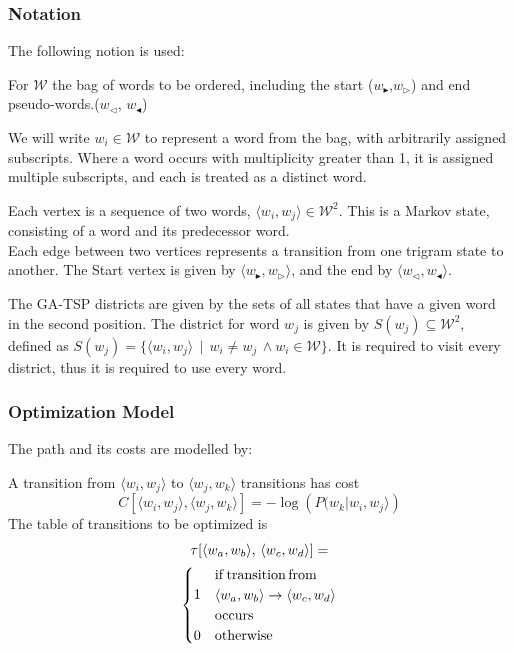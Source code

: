 \documentclass[twocolumn]{article}
\begin{document}
\newcommand{\s}{w_{\blacktriangleright}}
\renewcommand{\ss}{w_{\triangleright}}
\newcommand{\e}{w_{\triangleleft}}
\newcommand{\ee}{w_{\blacktriangleleft}}
\newcommand{\W}{\mathcal{W}}


\subsubsection{Notation}

The following notion is used:

For $\W$ the bag of words to be ordered, including the start ($\s$,$\ss$)
and end pseudo-words.($\e$, $\ee$)

We will write $w_{i}\in\W$ to represent a word from the bag, with
arbitrarily assigned subscripts. Where a word occurs with multiplicity
greater than 1, it is assigned multiple subscripts, and each is treated
as a distinct word.

Each vertex is a sequence of two words, $\langle w_{i},w_{j}\rangle\in\W^{2}$.
This is a Markov state, consisting of a word and its predecessor word. \\
Each edge between two vertices represents a transition from one trigram state to another.
The Start vertex is given by $\langle\s,\ss\rangle$, and the end by $\langle\e,\ee\rangle$.

The GA-TSP districts are given by the sets of all states that have
a given word in the second position. The district for word $w_{j}$
is given by $S(w_{j})\subseteq\W^{2}$, defined as $S(w_{j})=\{\langle w_{i},w_{j}\rangle\,\mid\,w_{i}\ne w_{j}\,\wedge w_{i}\in\W\}$. It is required to visit every district, thus it is required to use every word.




\subsubsection{Optimization Model}

The path and its costs are modelled by:

A transition from $\langle w_{i},w_{j}\rangle$ to $\langle w_{j},w_{k}\rangle$
transitions has cost $$C[\langle w_{i},w_{j}\rangle,\langle w_{j},w_{k}\rangle]=-\log\left(P(w_{k}|w_{i},w_{j}\rangle\right)$$ 
The table of transitions to be optimized is
\begin{multline*}
 \tau[\langle w_{a},w_{b}\rangle,\,\langle w_{c},w_{d}\rangle] = \\
 \begin{cases}
	 \multirow{3}{*}{1} & \mathrm{if\,transition\,from} \\
	 	                & \langle w_{a},w_{b}\rangle \to \langle w_{c},w_{d}\rangle\\
	 	                & \mathrm{occurs} \\
                     0  & \mathrm{otherwise}
  \end{cases}
\end{multline*}
\end{document}
